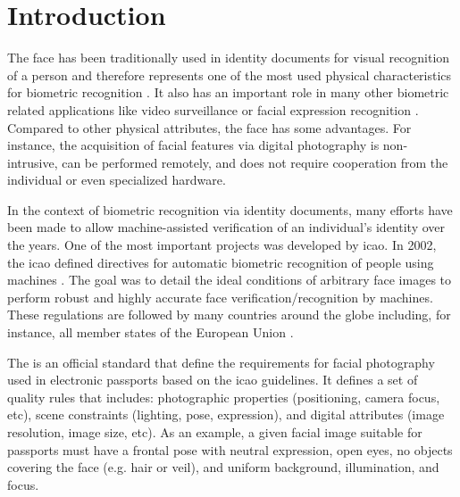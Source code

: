\section{Introduction}

The face has been traditionally used in identity documents for visual recognition of a person and therefore represents one of the most used physical characteristics for biometric recognition \citep{ferrara2012face}. It also has an important role in many other biometric related applications like video surveillance \citep{de2015partially} or facial expression recognition \citep{anil2016literature}. Compared to other physical attributes, the face has some advantages. For instance, the acquisition of facial features via digital photography is non-intrusive, can be performed remotely, and does not require cooperation from the individual or even specialized hardware.


In the context of biometric recognition via identity documents, many efforts have been made to allow machine-assisted verification of an individual's identity over the years. One of the most important projects was developed by \acf{icao}. In 2002, the \acs{icao} defined directives for automatic biometric recognition of people using machines \citep{icao2003report}. The goal was to detail the ideal conditions of arbitrary face images to perform robust and highly accurate face verification/recognition by machines. These regulations are followed by many countries around the globe including, for instance, all member states of the European Union \citep{ebinger2008international}.

The \icao \citep{iso-iec} is an official standard that define the requirements for facial photography used in electronic passports based on the \acs{icao} guidelines. It defines a set of quality rules that includes: photographic properties (positioning, camera focus, etc), scene constraints (lighting, pose, expression), and digital attributes (image resolution, image size, etc). As an example, a given facial image suitable for passports must have a frontal pose with neutral expression, open eyes, no objects covering the face (e.g. hair or veil), and uniform background, illumination, and focus.

